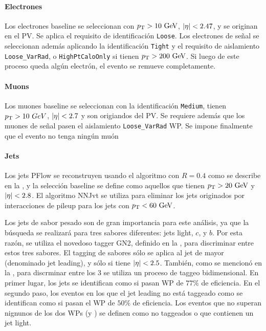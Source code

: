 \paragraph{Electrones}

Los electrones baseline se seleccionan con \(p_{\text{T}} > 10~\text{GeV}\), \(|\eta| < 2.47\), y se originan en el \ac{PV}. Se aplica el requisito de identificación \texttt{Loose}. Los electrones de señal se seleccionan además aplicando la identificación \texttt{Tight} y el requisito de aislamiento \texttt{Loose\_VarRad}, o \texttt{HighPtCaloOnly} si tienen \(p_{\text{T}} > 200~\text{GeV}\). Si luego de este proceso queda alg\'un electrón, el evento se remueve completamente.


\paragraph{Muons}
Los muones baseline se seleccionan con la identificación \texttt{Medium}, tienen \(p_{\text{T}} > 10~GeV\), \(|\eta| < 2.7\) y son origiandos del \ac{PV}. Se requiere además que los muones de señal pasen el aislamiento \texttt{Loose\_VarRad} \ac{WP}. Se impone finalmente que el evento no tenga ning\'un muón


\paragraph{Jets}

Los jets \ac{PFlow} se reconstruyen usando el algoritmo \antikt con \(R=0.4\) como se describe en la \Sect{\ref{sec:objects:jets}}, y la selección baseline se define como aquellos que tienen \(p_{\text{T}}>20~\text{GeV}\) y \(|\eta|<2.8\). El algoritmo \ac{NNJvt} se utiliza para eliminar los jets originados por interacciones de pileup para los jets con \(p_{\text{T}}<60~\text{GeV}\).

Los jets de sabor pesado son de gran importancia para este análisis, ya que la búsqueda se realizará para tres sabores diferentes: jets light, \(c\), y \(b\). Por esta razón, se utiliza el novedoso tagger GN2, definido en la \Sect{\ref{sec:objects:ftag}}, para discriminar entre estos tres sabores.
El tagging de sabores sólo se aplica al jet de mayor \pt (denominado jet leading), y sólo si tiene \(|\eta| < 2.5\).
También, como se mencionó en la \Sect{\ref{sec:objects:ftag}}, para discrminar entre los 3 se utiliza un proceso de taggeo bidimensional. En primer lugar, los jets se identifican como \bjets si pasan \ac{WP} de \(77\%\) de eficiencia.
En el segundo paso, los eventos en los que el jet leading no está taggeado como \bjet se identifican como \cjet si pasan el \ac{WP} de \(50\%\) de eficiencia. Los eventos que no superan nignunos de los dos \acp{WP} (\btag y \ctag) se definen como no taggeados o que contienen un jet light.


